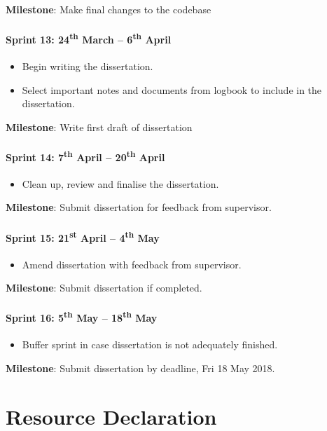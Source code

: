 \documentclass[a4paper]{article}
\begin{document}
\textbf{Milestone}: Make final changes to the codebase

\paragraph{Sprint 13: 24\textsuperscript{th} March -- 6\textsuperscript{th} April}
\begin{itemize}
\item Begin writing the dissertation.
\item Select important notes and documents from logbook to include in the dissertation.
\end{itemize}

\textbf{Milestone}: Write first draft of dissertation

\paragraph{Sprint 14: 7\textsuperscript{th} April -- 20\textsuperscript{th} April}
\begin{itemize}
\item Clean up, review and finalise the dissertation.
\end{itemize}

\textbf{Milestone}: Submit dissertation for feedback from supervisor.

\paragraph{Sprint 15: 21\textsuperscript{st} April -- 4\textsuperscript{th} May}
\begin{itemize}
\item Amend dissertation with feedback from supervisor.
\end{itemize}

\textbf{Milestone}: Submit dissertation if completed.

\paragraph{Sprint 16: 5\textsuperscript{th} May -- 18\textsuperscript{th} May}
\begin{itemize}
\item Buffer sprint in case dissertation is not adequately finished.
\end{itemize}

\textbf{Milestone}: Submit dissertation by deadline, Fri 18 May 2018.


\section*{Resource Declaration}
\end{document}
